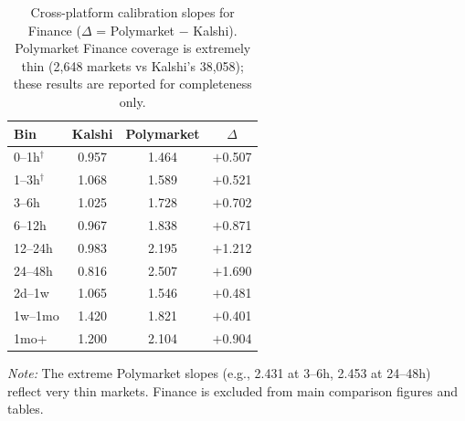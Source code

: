 \documentclass[11pt,a4paper]{article}
\begin{document}
\begin{table}[!ht]
\caption{Cross-platform calibration slopes for Finance ($\Delta$ = Polymarket $-$ Kalshi). Polymarket Finance coverage is extremely thin (2,648 markets vs Kalshi's 38,058); these results are reported for completeness only.\label{tab:cp_finance}}
\centering
\small
\begin{tabular}{lccc}
\toprule
Bin & Kalshi & Polymarket & $\Delta$ \\
\midrule
0--1h$^\dagger$  & 0.957 & 1.464 & $+$0.507 \\
1--3h$^\dagger$  & 1.068 & 1.589 & $+$0.521 \\
3--6h            & 1.025 & 1.728 & $+$0.702 \\
6--12h           & 0.967 & 1.838 & $+$0.871 \\
12--24h          & 0.983 & 2.195 & $+$1.212 \\
24--48h          & 0.816 & 2.507 & $+$1.690 \\
2d--1w           & 1.065 & 1.546 & $+$0.481 \\
1w--1mo          & 1.420 & 1.821 & $+$0.401 \\
1mo+             & 1.200 & 2.104 & $+$0.904 \\
\bottomrule
\end{tabular}
\begin{flushleft}
\small\textit{Note:} The extreme Polymarket slopes (e.g., 2.431 at 3--6h, 2.453 at 24--48h) reflect very thin markets. Finance is excluded from main comparison figures and tables.
\end{flushleft}
\end{table}
\end{document}
